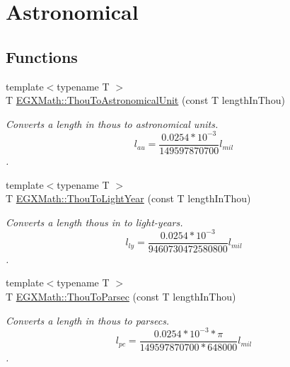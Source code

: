 \hypertarget{group___e_g_x_math-_conversions-_length_conversions-_imperial-_thou-_astronomical}{}\section{Astronomical}
\label{group___e_g_x_math-_conversions-_length_conversions-_imperial-_thou-_astronomical}
\subsection*{Functions}
\begin{DoxyCompactItemize}
\item 
{\footnotesize template$<$typename T $>$ }\\T \mbox{\hyperlink{group___e_g_x_math-_conversions-_length_conversions-_imperial-_thou-_astronomical_gaf6e57bc733c3644d4ca1a6c0bb836b42}{E\+G\+X\+Math\+::\+Thou\+To\+Astronomical\+Unit}} (const T length\+In\+Thou)
\begin{DoxyCompactList}\small\item\em Converts a length in thous to astronomical units. \[ l_{au}=\frac{0.0254 * 10^{-3}}{149597870700} l_{mil} \]. \end{DoxyCompactList}\item 
{\footnotesize template$<$typename T $>$ }\\T \mbox{\hyperlink{group___e_g_x_math-_conversions-_length_conversions-_imperial-_thou-_astronomical_gab36cdfc79de8c7cde7dedb7b08a6323e}{E\+G\+X\+Math\+::\+Thou\+To\+Light\+Year}} (const T length\+In\+Thou)
\begin{DoxyCompactList}\small\item\em Converts a length thous in to light-\/years. \[ l_{ly}=\frac{0.0254 * 10^{-3}}{9460730472580800} l_{mil} \]. \end{DoxyCompactList}\item 
{\footnotesize template$<$typename T $>$ }\\T \mbox{\hyperlink{group___e_g_x_math-_conversions-_length_conversions-_imperial-_thou-_astronomical_gaa2a5b00bb5a83ba8f22f9c2f15ecc112}{E\+G\+X\+Math\+::\+Thou\+To\+Parsec}} (const T length\+In\+Thou)
\begin{DoxyCompactList}\small\item\em Converts a length in thous to parsecs. \[ l_{pc}=\frac{0.0254 * 10^{-3} * \pi}{149597870700 * 648000} l_{mil} \]. \end{DoxyCompactList}\end{DoxyCompactItemize}


